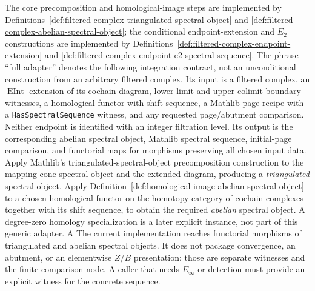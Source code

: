 \begin{definition}
  \label{def:filtered-complex-spectral-object-adapter}
  \notready
  The core precomposition and homological-image steps are implemented by
  Definitions~\ref{def:filtered-complex-triangulated-spectral-object} and
  \ref{def:filtered-complex-abelian-spectral-object}; the conditional
  endpoint-extension and $E_2$ constructions are implemented by
  Definitions~\ref{def:filtered-complex-endpoint-extension} and
  \ref{def:filtered-complex-endpoint-e2-spectral-sequence}.  The phrase
  ``full adapter'' denotes the following integration contract, not an
  unconditional construction from an arbitrary filtered complex.  Its input
  is a filtered complex, an $\operatorname{EInt}$ extension of its cochain
  diagram, lower-limit and upper-colimit boundary witnesses, a homological
  functor with shift sequence, a Mathlib page recipe with a
  \texttt{HasSpectralSequence} witness, and any requested page/abutment
  comparison.  Neither endpoint is identified with an integer filtration
  level.  Its output is the corresponding abelian spectral object, Mathlib
  spectral sequence, initial-page comparison, and functorial maps for
  morphisms preserving all chosen input data.  Apply Mathlib's
  triangulated-spectral-object precomposition construction to the mapping-cone
  spectral object and the extended diagram, producing a \emph{triangulated}
  spectral object.  Apply
  Definition~\ref{def:homological-image-abelian-spectral-object} to a chosen
  homological functor on the homotopy category of cochain complexes together
  with its shift sequence, to obtain the required \emph{abelian} spectral
  object.  A degree-zero homology specialization is a later explicit
  instance, not part of this generic adapter.  A
  The current implementation reaches functorial morphisms of triangulated and
  abelian spectral objects.  It does not package convergence, an abutment, or
  an elementwise $Z/B$ presentation: those are separate witnesses and the
  finite comparison node.  A caller that needs $E_\infty$ or detection must
  provide an explicit witness for the concrete sequence.
\end{definition}

